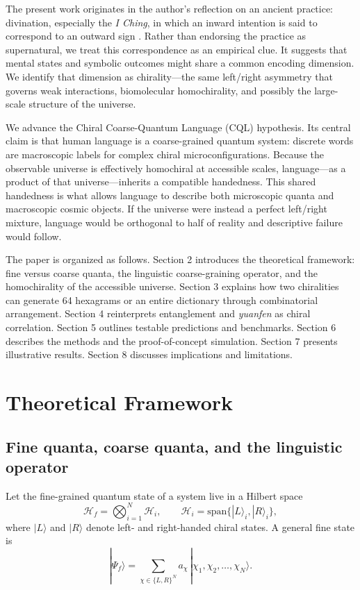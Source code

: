 \documentclass[11pt,a4paper]{article}
\begin{document}
The present work originates in the author’s reflection on an ancient practice: divination, especially the \emph{I Ching}, in which an inward intention is said to correspond to an outward sign \cite{wilhelm50}. Rather than endorsing the practice as supernatural, we treat this correspondence as an empirical clue. It suggests that mental states and symbolic outcomes might share a common encoding dimension. We identify that dimension as chirality---the same left/right asymmetry that governs weak interactions, biomolecular homochirality, and possibly the large-scale structure of the universe.

We advance the Chiral Coarse-Quantum Language (CQL) hypothesis. Its central claim is that human language is a coarse-grained quantum system: discrete words are macroscopic labels for complex chiral microconfigurations. Because the observable universe is effectively homochiral at accessible scales, language---as a product of that universe---inherits a compatible handedness. This shared handedness is what allows language to describe both microscopic quanta and macroscopic cosmic objects. If the universe were instead a perfect left/right mixture, language would be orthogonal to half of reality and descriptive failure would follow.

The paper is organized as follows. Section 2 introduces the theoretical framework: fine versus coarse quanta, the linguistic coarse-graining operator, and the homochirality of the accessible universe. Section 3 explains how two chiralities can generate 64 hexagrams or an entire dictionary through combinatorial arrangement. Section 4 reinterprets entanglement and \emph{yuanfen} as chiral correlation. Section 5 outlines testable predictions and benchmarks. Section 6 describes the methods and the proof-of-concept simulation. Section 7 presents illustrative results. Section 8 discusses implications and limitations.

\section{Theoretical Framework}

\subsection{Fine quanta, coarse quanta, and the linguistic operator}

Let the fine-grained quantum state of a system live in a Hilbert space
\begin{equation}
\mathcal{H}_f = \bigotimes_{i=1}^{N} \mathcal{H}_i,
\qquad
\mathcal{H}_i = \mathrm{span}\{|L\rangle_i, |R\rangle_i\},
\end{equation}
where $|L\rangle$ and $|R\rangle$ denote left- and right-handed chiral states. A general fine state is
\begin{equation}
|\Psi_f\rangle = \sum_{\chi \in \{L,R\}^N} a_\chi \, |\chi_1,\chi_2,\dots,\chi_N\rangle.
\end{equation}
\end{document}
